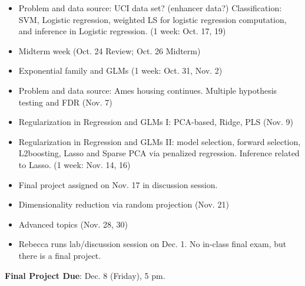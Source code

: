 \documentclass[11pt]{article}
\begin{document}
\begin{itemize}
\item 
Problem and data source: UCI data set? (enhancer data?)
Classification: SVM, Logistic regression, weighted LS for logistic regression
computation, and inference in Logistic regression. (1 week: Oct. 17, 19)

\item Midterm week (Oct. 24 Review; Oct. 26 Midterm)







\item Exponential family and GLMs (1 week: Oct. 31, Nov. 2)

\item Problem and data source: Ames housing continues.
Multiple hypothesis testing and FDR (Nov. 7)

\item Regularization in Regression and GLMs I: PCA-based, Ridge,  PLS (Nov. 9)

\item
Regularization in Regression and GLMs II: model selection, forward selection, L2boosting, Lasso and Sparse PCA via penalized regression. Inference related
to Lasso.  (1 week: Nov. 14, 16)

\item Final project assigned on Nov. 17 in discussion session.


\item Dimensionality reduction via random projection (Nov. 21) 

\item Advanced topics (Nov. 28, 30)


\item 
Rebecca runs lab/discussion session on Dec. 1. No in-class final exam, but there is a final project.
\end{itemize}

{\bf Final Project Due}: Dec. 8 (Friday), 5 pm.
\end{document}
